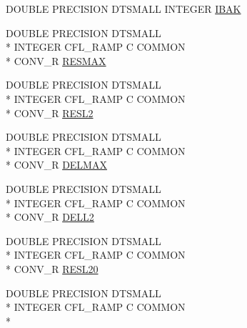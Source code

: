 \begin{DoxyCompactItemize}
\item 
D\-O\-U\-B\-L\-E P\-R\-E\-C\-I\-S\-I\-O\-N D\-T\-S\-M\-A\-L\-L I\-N\-T\-E\-G\-E\-R \hyperlink{msa20_2home_2abonfi_2_c_f_d__codes_2_eul_f_s_83_82_83_2include_2conv_8com_aab06481a8652a66f0849ac8bba3eadca}{I\-B\-A\-K}
\item 
D\-O\-U\-B\-L\-E P\-R\-E\-C\-I\-S\-I\-O\-N D\-T\-S\-M\-A\-L\-L \\*
I\-N\-T\-E\-G\-E\-R C\-F\-L\-\_\-\-R\-A\-M\-P C C\-O\-M\-M\-O\-N \\*
C\-O\-N\-V\-\_\-\-R \hyperlink{msa20_2home_2abonfi_2_c_f_d__codes_2_eul_f_s_83_82_83_2include_2conv_8com_a5a9ca2e120b65c5a46caf09d3a3aff16}{R\-E\-S\-M\-A\-X}
\item 
D\-O\-U\-B\-L\-E P\-R\-E\-C\-I\-S\-I\-O\-N D\-T\-S\-M\-A\-L\-L \\*
I\-N\-T\-E\-G\-E\-R C\-F\-L\-\_\-\-R\-A\-M\-P C C\-O\-M\-M\-O\-N \\*
C\-O\-N\-V\-\_\-\-R \hyperlink{msa20_2home_2abonfi_2_c_f_d__codes_2_eul_f_s_83_82_83_2include_2conv_8com_a4c87ffcd683e561c462fb951f8fd3dba}{R\-E\-S\-L2}
\item 
D\-O\-U\-B\-L\-E P\-R\-E\-C\-I\-S\-I\-O\-N D\-T\-S\-M\-A\-L\-L \\*
I\-N\-T\-E\-G\-E\-R C\-F\-L\-\_\-\-R\-A\-M\-P C C\-O\-M\-M\-O\-N \\*
C\-O\-N\-V\-\_\-\-R \hyperlink{msa20_2home_2abonfi_2_c_f_d__codes_2_eul_f_s_83_82_83_2include_2conv_8com_a715eab8d5cd0cd49a247520cd432061c}{D\-E\-L\-M\-A\-X}
\item 
D\-O\-U\-B\-L\-E P\-R\-E\-C\-I\-S\-I\-O\-N D\-T\-S\-M\-A\-L\-L \\*
I\-N\-T\-E\-G\-E\-R C\-F\-L\-\_\-\-R\-A\-M\-P C C\-O\-M\-M\-O\-N \\*
C\-O\-N\-V\-\_\-\-R \hyperlink{msa20_2home_2abonfi_2_c_f_d__codes_2_eul_f_s_83_82_83_2include_2conv_8com_a95e10880467f92be3f5430f2d2ac274b}{D\-E\-L\-L2}
\item 
D\-O\-U\-B\-L\-E P\-R\-E\-C\-I\-S\-I\-O\-N D\-T\-S\-M\-A\-L\-L \\*
I\-N\-T\-E\-G\-E\-R C\-F\-L\-\_\-\-R\-A\-M\-P C C\-O\-M\-M\-O\-N \\*
C\-O\-N\-V\-\_\-\-R \hyperlink{msa20_2home_2abonfi_2_c_f_d__codes_2_eul_f_s_83_82_83_2include_2conv_8com_a7c9ea192bf2277352d3bf39c771cfdba}{R\-E\-S\-L20}
\item 
D\-O\-U\-B\-L\-E P\-R\-E\-C\-I\-S\-I\-O\-N D\-T\-S\-M\-A\-L\-L \\*
I\-N\-T\-E\-G\-E\-R C\-F\-L\-\_\-\-R\-A\-M\-P C C\-O\-M\-M\-O\-N \\*

\end{DoxyCompactItemize}
